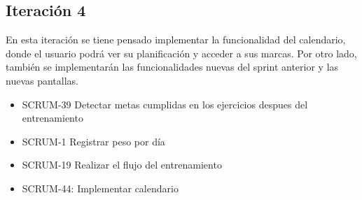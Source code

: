 \subsection{Iteraci\'on 4}

En esta iteración se tiene pensado implementar la funcionalidad del calendario, donde el usuario podrá ver su planificación y acceder a sus marcas. Por otro lado, también se implementarán las funcionalidades nuevas del sprint anterior y las nuevas pantallas.

\begin{itemize}
	  \item SCRUM-39 Detectar metas cumplidas en los ejercicios despues del entrenamiento
	  \item SCRUM-1 Registrar peso por día
	  \item SCRUM-19 Realizar el flujo del entrenamiento
	  \item SCRUM-44: Implementar calendario
\end{itemize}

